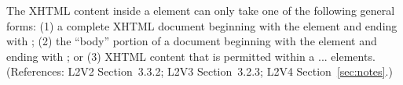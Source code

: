 The XHTML content inside a  element can only take one of the
following general forms: (1) a complete XHTML document beginning with the
element  and ending with ; (2) the ``body''
portion of a document beginning with the element  and ending
with ; or (3) XHTML content that is permitted within a
 ...  elements.  (References: L2V2
Section~3.3.2; L2V3 Section~3.2.3; L2V4 Section~\ref{sec:notes}.)
